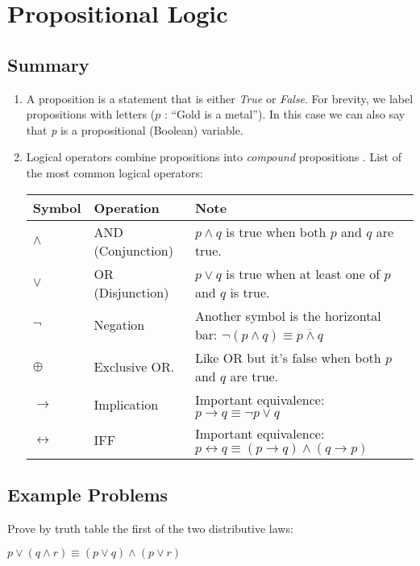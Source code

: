 \documentclass[solution, letterpaper]{cs20}
\begin{document}
	\section{Propositional Logic}
	\subsection{Summary}
	    \begin{enumerate}

        \item  A proposition is a statement that is either \emph{True} or \emph{False}. For brevity, we label propositions with letters ($p$ : ``Gold is a metal'').  In this case we can also say that \emph{p} is a propositional (Boolean) variable.
        \item Logical operators combine propositions into \emph{compound} propositions . List of the most common logical operators:

        \begin{tabular}{ | l l l |}
        \hline
        Symbol & Operation & Note\\
        \hline
        $\land$ & AND (Conjunction) & $p \land q$ is true when both $p$ and $q$ are true.\\
        \hline
        $\lor$ & OR (Disjunction)& $p \lor q$ is true when at least one of $p$ and $q$ is true.\\
        \hline
        $\neg$ & Negation & Another symbol is the horizontal bar: $\neg(p \land q) \equiv \overline{p \land q}$\\
        \hline
        $\oplus$ & Exclusive OR. & Like OR but it's false when both $p$ and $q$ are true. \\
        \hline
        $\to$ & Implication & Important equivalence: $p\to q \equiv \neg p \lor q$\\
        \hline
        $\leftrightarrow$ & IFF & Important equivalence: $p \leftrightarrow q \equiv (p \to q) \land (q \to p)$\\
        \hline
        \end{tabular}
        \end{enumerate}
    \subsection{Example Problems}

        \problem{}{}

        Prove by truth table the first of the two distributive laws:
        \begin{center}
        $p \lor (q \land r) \equiv (p \lor q) \land (p \lor r)$
        \end{center}
\end{document}
